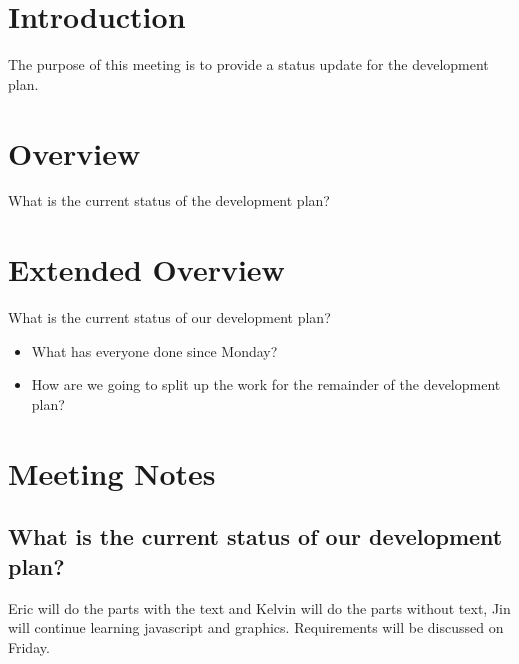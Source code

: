 \documentclass[11pt]{meetingmins}
\begin{document}
\maketitle

\section{Introduction}
The purpose of this meeting is to provide a status update for the development 
plan.

\section{Overview}
\begin{hiddenitems}

\item
What is the current status of the development plan?

\end{hiddenitems}

\section{Extended Overview}
\begin{hiddenitems}
\item
What is the current status of our development plan?
\begin{itemize}
	\item{What has everyone done since Monday?}
	\item{How are we going to split up the work for the remainder of the 
development plan?}
\end{itemize}

\end{hiddenitems}

\section{Meeting Notes}
	\subsection{What is the current status of our development plan?}
		Eric will do the parts with the text and Kelvin will do the parts without 
text, Jin will continue learning javascript and 		graphics. Requirements will be 
discussed on Friday.
		

	\vspace{1em}
\end{document}
